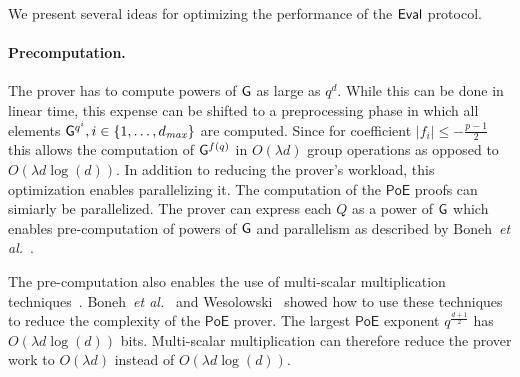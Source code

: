 We present several ideas for optimizing the performance of the $\textsf{{Eval}}$ protocol.

\paragraph{Precomputation.} The prover has to compute powers of $\gr{g}$ as large as $q^d$. While this can be done in linear time, this expense can be shifted to a preprocessing phase in which all elements $\gr{g}^{q^i}, i \in \{1, \ldots, d_{\it max}\}$ are computed. Since for coefficient $|f_i|\leq -\frac{p-1}{2}$ this allows the computation of $\gr{g}^{f(q)}$ in $O(\lambda d)$ group operations as opposed to $O(\lambda d \log(d))$.
In addition to reducing the prover's workload, this optimization enables parallelizing it. The computation of the $\textsf{PoE}$ proofs can simiarly be parallelized. The prover can express each $Q$ as a power of $\gr{g}$ which enables pre-computation of powers of $\gr{g}$ and parallelism as described by Boneh~\emph{et al.}~\cite{C:BonBunFis19}.

The pre-computation also enables the use of multi-scalar multiplication techniques~\cite{pippenger1980evaluation}. Boneh~\emph{et al.}~\cite{C:BonBunFis19} and Wesolowski~\cite{EC:Wesolowski19} showed how to use these techniques to reduce the complexity of the $\textsf{PoE}$ prover. The largest $\textsf{PoE}$ exponent $q^{\frac{d+1}{2}}$ has $O(\lambda d \log(d))$ bits. Multi-scalar multiplication can therefore reduce the prover work to $O(\lambda d)$ instead of $O(\lambda d \log(d))$.


